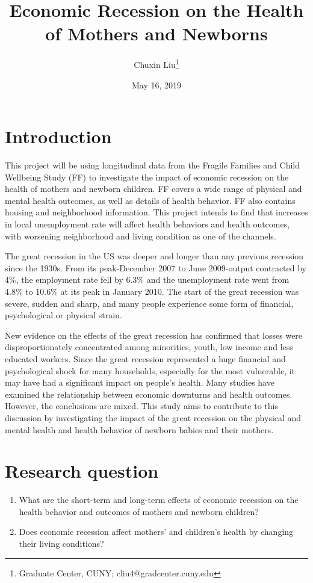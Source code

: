 \documentclass[12pt]{article}
\begin{document}
\title{\textbf{Economic Recession on the Health of Mothers and Newborns}}
\author{Chuxin Liu\thanks{Graduate Center, CUNY; cliu4@gradcenter.cuny.edu}}
\date{May 16, 2019}
\maketitle


\section{Introduction} \label{sec:introduction}

This project will be using longitudinal data from the Fragile Families and Child Wellbeing Study (FF) to investigate the impact of economic recession on the health of mothers and newborn children. FF covers a wide range of physical and mental health outcomes, as well as details of health behavior. FF also contains housing and neighborhood information. This project intends to find that increases in local unemployment rate will affect health behaviors and health outcomes, with worsening neighborhood and living condition as one of the channels.

The great recession in the US was deeper and longer than any previous recession since the 1930s. From its peak-December 2007 to June 2009-output contracted by 4\%, the employment rate fell by 6.3\% and the unemployment rate went from 4.8\% to 10.6\% at its peak in January 2010. The start of the great recession was severe, sudden and sharp, and many people experience some form of financial, psychological or physical strain. 

New evidence on the effects of the great recession has confirmed that losses were disproportionately concentrated among minorities, youth, low income and less educated workers. Since the great recession represented a huge financial and psychological shock for many households, especially for the most vulnerable, it may have had a significant impact on people’s health. Many studies have examined the relationship between economic downturns and health outcomes. However, the conclusions are mixed. This study aims to contribute to this discussion by investigating the impact of the great recession on the physical and mental health and health behavior of newborn babies and their mothers.
 
 
\section{Research question} 
\label{sec:question}
\begin{enumerate}
    \item What are the short-term and long-term effects of economic recession on the health behavior and outcomes of mothers and newborn children? 
	\item Does economic recession affect mothers’ and children’s health by changing their living conditions?
\end{enumerate}
\end{document}
